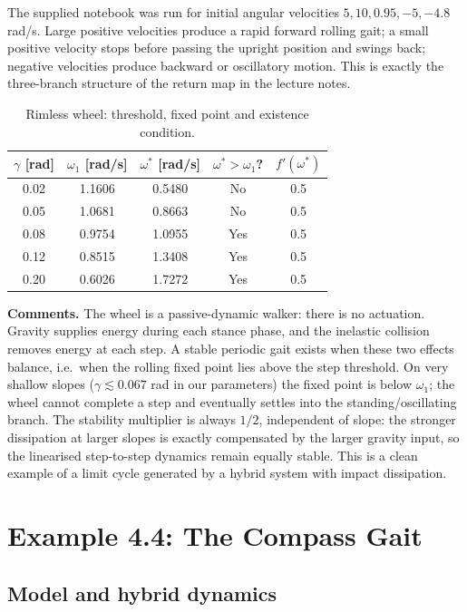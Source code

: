 \documentclass[11pt]{article}
\begin{document}
The supplied notebook was run for initial angular velocities
$5,10,0.95,-5,-4.8$ rad/s.  Large positive velocities produce a rapid forward
rolling gait; a small positive velocity stops before passing the upright
position and swings back; negative velocities produce backward or oscillatory
motion.  This is exactly the three-branch structure of the return map in the
lecture notes.

\begin{table}[H]
\centering
\caption{Rimless wheel: threshold, fixed point and existence condition.}
\begin{tabular}{ccccc}
\toprule
$\gamma$ [rad] & $\omega_1$ [rad/s] & $\omega^*$ [rad/s] &
$\omega^*>\omega_1$? & $f'(\omega^*)$ \\
\midrule
0.02 & 1.1606 & 0.5480 & No & 0.5 \\
0.05 & 1.0681 & 0.8663 & No & 0.5 \\
0.08 & 0.9754 & 1.0955 & Yes & 0.5 \\
0.12 & 0.8515 & 1.3408 & Yes & 0.5 \\
0.20 & 0.6026 & 1.7272 & Yes & 0.5 \\
\bottomrule
\end{tabular}
\end{table}

\textbf{Comments.}  The wheel is a passive-dynamic walker: there is no
actuation.  Gravity supplies energy during each stance phase, and the
inelastic collision removes energy at each step.  A stable periodic gait exists
when these two effects balance, i.e.\ when the rolling fixed point lies above
the step threshold.  On very shallow slopes ($\gamma\lesssim0.067$ rad in our
parameters) the fixed point is below $\omega_1$; the wheel cannot complete a
step and eventually settles into the standing/oscillating branch.  The
stability multiplier is always $1/2$, independent of slope: the stronger
dissipation at larger slopes is exactly compensated by the larger gravity
input, so the linearised step-to-step dynamics remain equally stable.  This is
a clean example of a limit cycle generated by a hybrid system with impact
dissipation.

\section{Example 4.4: The Compass Gait}

\subsection{Model and hybrid dynamics}
\end{document}
